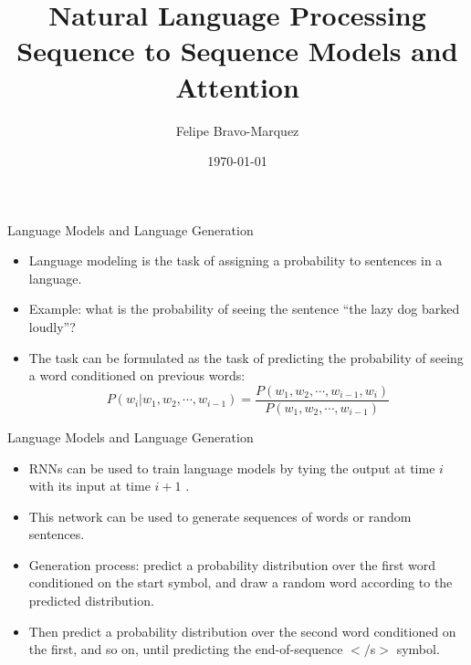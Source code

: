\documentclass[handout]{beamer}
\title{Natural Language Processing \\ Sequence to Sequence Models and Attention}
\author[Felipe Bravo Márquez]{\footnotesize
 \textcolor[rgb]{0.00,0.00,1.00}{Felipe Bravo-Marquez}}
\date{\today}
\begin{document}
\begin{frame}
\titlepage


\end{frame}




\begin{frame}{Language Models and Language Generation}
\begin{scriptsize}
\begin{itemize}
\item Language modeling is the task of assigning a probability to sentences in a language.
\item Example: what is the probability of seeing the sentence ``the lazy dog barked loudly''?
\item The task can be formulated as the task of predicting the probability of seeing a word conditioned on previous words:
\begin{displaymath}
 P(w_i | w_1, w_2, \cdots, w_{i-1}) = \frac{P(w_1, w_2, \cdots, w_{i-1}, w_i)}{P(w_1, w_2, \cdots, w_{i-1})}  
\end{displaymath}

\end{itemize}
\end{scriptsize}
\end{frame}


\begin{frame}{Language Models and Language Generation}
\begin{scriptsize}
\begin{itemize}
\item  RNNs can be used to train language models by tying the output at time $i$ with its input at time $i + 1$ .
\item This network can be used to generate sequences of words or random sentences.
\item Generation process: predict a probability distribution over the first word conditioned on the start symbol, and draw a random word according to the predicted
distribution.

\item Then predict a probability distribution over the second word conditioned on the first, and so on, until predicting the end-of-sequence $</$s$>$ symbol.
\end{itemize}
\end{scriptsize}
\end{frame}
\end{document}
